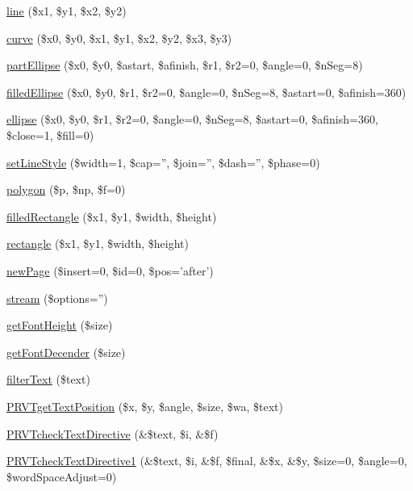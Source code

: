 \begin{DoxyCompactItemize}
\item 
\hyperlink{class_cpdf_af1d651738f85ded800eda901655992be}{line} (\$x1, \$y1, \$x2, \$y2)
\item 
\hyperlink{class_cpdf_a13c3a2e45741b553d81496482a6a9579}{curve} (\$x0, \$y0, \$x1, \$y1, \$x2, \$y2, \$x3, \$y3)
\item 
\hyperlink{class_cpdf_a01283c9d18d281852c058bd6660d75a8}{part\-Ellipse} (\$x0, \$y0, \$astart, \$afinish, \$r1, \$r2=0, \$angle=0, \$n\-Seg=8)
\item 
\hyperlink{class_cpdf_a7d14967703e2beb4591ea33187d71f83}{filled\-Ellipse} (\$x0, \$y0, \$r1, \$r2=0, \$angle=0, \$n\-Seg=8, \$astart=0, \$afinish=360)
\item 
\hyperlink{class_cpdf_ab56f65d9ba54f403a6bd7a007134808a}{ellipse} (\$x0, \$y0, \$r1, \$r2=0, \$angle=0, \$n\-Seg=8, \$astart=0, \$afinish=360, \$close=1, \$fill=0)
\item 
\hyperlink{class_cpdf_a8e3b86cfcb5e8d0ad44fa5196f40a6b1}{set\-Line\-Style} (\$width=1, \$cap='', \$join='', \$dash='', \$phase=0)
\item 
\hyperlink{class_cpdf_aaf7ac386285317f442a825dd02f49fe9}{polygon} (\$p, \$np, \$f=0)
\item 
\hyperlink{class_cpdf_a519df1355cd54eb52caa42650c7fcc2e}{filled\-Rectangle} (\$x1, \$y1, \$width, \$height)
\item 
\hyperlink{class_cpdf_adc6135070daab0159a4c75d04ebbc8ac}{rectangle} (\$x1, \$y1, \$width, \$height)
\item 
\hyperlink{class_cpdf_ae150a1dceeb483a42acaedbe73ccd692}{new\-Page} (\$insert=0, \$id=0, \$pos='after')
\item 
\hyperlink{class_cpdf_a27bdbd15ab2ad7f53187295651b345e7}{stream} (\$options='')
\item 
\hyperlink{class_cpdf_a6beae3dc84460fede62c6a0ca8861277}{get\-Font\-Height} (\$size)
\item 
\hyperlink{class_cpdf_adedb392d14ce7963b05c5ca389181699}{get\-Font\-Decender} (\$size)
\item 
\hyperlink{class_cpdf_a984113695ea977929b4b7795fbf41cd2}{filter\-Text} (\$text)
\item 
\hyperlink{class_cpdf_ada9e29ddfcdecb498a13811a03bf0716}{\-P\-R\-V\-Tget\-Text\-Position} (\$x, \$y, \$angle, \$size, \$wa, \$text)
\item 
\hyperlink{class_cpdf_a74a8799ea1bd2492c8f166c99ab8c588}{\-P\-R\-V\-Tcheck\-Text\-Directive} (\&\$text, \$i, \&\$f)
\item 
\hyperlink{class_cpdf_a0431a00e90c0a4cb96e22e9af5c92927}{\-P\-R\-V\-Tcheck\-Text\-Directive1} (\&\$text, \$i, \&\$f, \$final, \&\$x, \&\$y, \$size=0, \$angle=0, \$word\-Space\-Adjust=0)

\end{DoxyCompactItemize}

